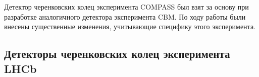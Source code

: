 
Детектор черенковских колец эксперимента COMPASS был взят за основу при разработке аналогичного детектора эксперимента CBM. По ходу работы были внесены существенные изменения, учитывающие специфику этого эксперимента.


\subsection{Детекторы черенковских колец эксперимента LHCb}\label{sec:LHCb}



